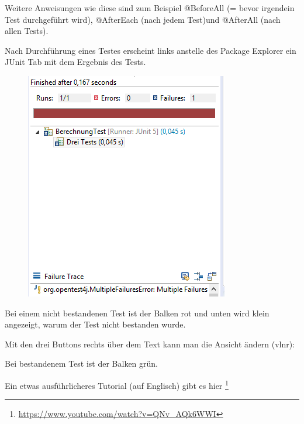 Weitere Anweisungen wie diese sind zum Beispiel @BeforeAll (= bevor irgendein Test durchgeführt wird), @AfterEach (nach jedem Test)und  @AfterAll (nach allen Tests).

Nach Durchführung eines Testes erscheint links anstelle des Package Explorer ein JUnit Tab mit dem Ergebnis des Tests. 
 \begin{figure}[H]
\centering
\includegraphics{Bilder/TRJU_7.png}
\end{figure}
Bei einem nicht bestandenen Test ist der Balken rot und unten wird klein angezeigt, warum der Test nicht bestanden wurde.

Mit den drei Buttons rechts über dem Text kann man die Ansicht ändern (vlnr): 

Bei bestandenem Test ist der Balken grün.

Ein etwas ausführlicheres Tutorial (auf Englisch) gibt es hier
\footnote{\url{https://www.youtube.com/watch?v=QNv_AQk6WWI}}
\nsecend %